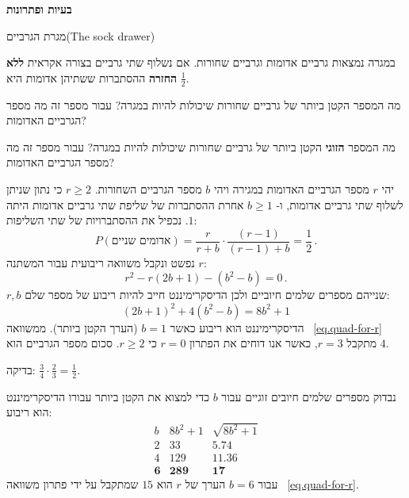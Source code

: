 


\begin{center}
\textbf{\LARGE בעיות ופתרונות}
\end{center}


\begin{prob}{מגרת הגרביים}{}{(The sock drawer)}

במגרה נמצאות גרביים אדומות וגרביים שחורות. אם נשלוף שתי גרביים בצורה אקראית
\textbf{ללא החזרה}
ההסתברות ששתיהן אדומות היא
$\frac{1}{2}$. 

מה המספר הקטן ביותר של גרביים שחורות שיכולות להיות במגרה? עבור מספר זה מה מספר הגרביים האדומות?

מה המספר 
\textbf{הזוגי}
הקטן ביותר של גרביים שחורות שיכולות להיות במגרה? עבור מספר זה מה מספר הגרביים האדומות?

\end{prob}

יהי
$r$
מספר הגרביים האדומות במגירה ויהי 
$b$
מספר הגרביים השחורות. 
$r\geq 2$
כי נתון שניתן לשלוף שתי גרביים אדומות, ו-%
$b\geq 1$
אחרת ההסתברות של שליפת שתי גרביים אדומות היתה 
$1$.
נכפיל את ההסתברויות של שתי השליפות:
\begin{equation}\label{eq.1-a}
P(\textrm{אדומים שניים})=\frac{r}{r+b} \cdot \frac{(r-1)}{(r-1)+b} = \frac{1}{2}\,.
\end{equation}
נפשט ונקבל משוואה ריבועית עבור המשתנה 
$r$:
\begin{equation}\label{eq.quad-for-r}
r^2-r(2b+1)-(b^2-b)=0\,.
\end{equation}
$r,b$
שנייהם מספרים שלמים חיוביים ולכן הדיסקרימיננט חייב להיות ריבוע של מספר שלם:
\begin{equation}\label{eq.discriminant}
(2b+1)^2+4(b^2-b)=8b^2+1
\end{equation}
הדיסקרימיננט הוא ריבוע כאשר 
$b=1$
(הערך הקטן ביותר). ממשוואה%
~\ref{eq.quad-for-r}
מתקבל 
$r=3$,
כאשר אנו דוחים את הפתרון 
$r=0$
כי
$r\geq 2$.
סכום מספר הגרביים הוא 
$4$.

בדיקה:
$\frac{3}{4}\cdot\frac{2}{3}=\frac{1}{2}$.

\medskip

נבדוק מספרים שלמים חיובים זוגיים עבור 
$b$
כדי למצוא את הקטן ביותר עבורו הדיסקרימיננט הוא ריבוע:
\begin{displaymath}
\renewcommand{\arraystretch}{1}
\begin{array}{r|r|r}
b&8b^2+1&\sqrt{8b^2+1}\\
\hline
2&33&5.74\\
4&129&11.36\\
\mathbf{6}&\mathbf{289}&\mathbf{17}
\end{array}
\end{displaymath}
עבור
$b=6$ 
הערך של 
$r$
הוא
$15$
שמתקבל על ידי פתרון משוואה%
~\ref{eq.quad-for-r}.

